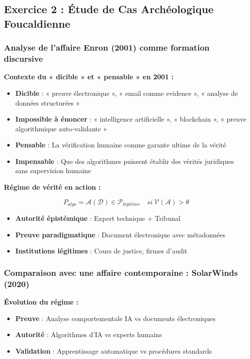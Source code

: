 \documentclass[12pt, a4paper]{article}
\begin{document}
\subsection*{Exercice 2 : Étude de Cas Archéologique Foucaldienne}

\subsubsection*{Analyse de l'affaire Enron (2001) comme formation discursive}

\textbf{Contexte du « dicible » et « pensable » en 2001 :}

\begin{itemize}
\item \textbf{Dicible} : « preuve électronique », « email comme evidence », « analyse de données structurées »
\item \textbf{Impossible à énoncer} : « intelligence artificielle », « blockchain », « preuve algorithmique auto-validante »
\item \textbf{Pensable} : La vérification humaine comme garante ultime de la vérité
\item \textbf{Impensable} : Que des algorithmes puissent établir des vérités juridiques sans supervision humaine
\end{itemize}

\textbf{Régime de vérité en action :}

\[
P_{algo} = \mathcal{A}(\mathcal{D}) \in \mathcal{P}_{légitime} \quad si\ \mathcal{V}(\mathcal{A}) > \theta
\]

\begin{itemize}
\item \textbf{Autorité épistémique} : Expert technique + Tribunal
\item \textbf{Preuve paradigmatique} : Document électronique avec métadonnées
\item \textbf{Institutions légitimes} : Cours de justice, firmes d'audit
\end{itemize}

\subsubsection*{Comparaison avec une affaire contemporaine : SolarWinds (2020)}

\textbf{Évolution du régime :}
\begin{itemize}
\item \textbf{Preuve} : Analyse comportementale IA vs documents électroniques
\item \textbf{Autorité} : Algorithmes d'IA vs experts humains
\item \textbf{Validation} : Apprentissage automatique vs procédures standards
\end{itemize}
\end{document}
